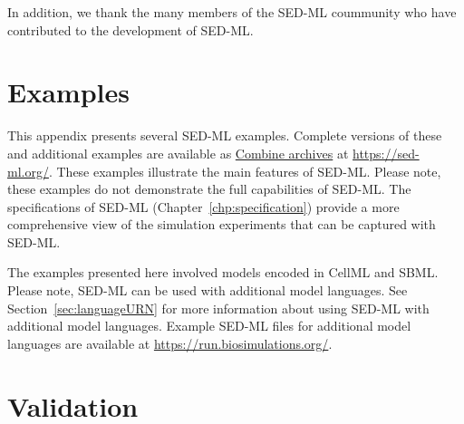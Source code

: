 \documentclass[pdftex,rgb,dvipsnames,svgnames,hyperref,table]{report}
\begin{document}
In addition, we thank the many members of the SED-ML coummunity who have contributed to the development of SED-ML.

\appendix

\chapter{Examples}
\label{app:examples}
This appendix presents several SED-ML examples. Complete versions of these and additional examples are available as \hyperref[sec:archive]{Combine archives} at \url{https://sed-ml.org/}. These examples illustrate the main features of SED-ML. Please note, these examples do not demonstrate the full capabilities of SED-ML. The specifications of SED-ML (Chapter~\ref{chp:specification}) provide a more comprehensive view of the simulation experiments that can be captured with SED-ML. 

The examples presented here involved models encoded in CellML and SBML. Please note, SED-ML can be used with additional model languages. See Section~\ref{sec:languageURN} for more information about using SED-ML with additional model languages. Example SED-ML files for additional model languages are available at \url{https://run.biosimulations.org/}.



\chapter{Validation}
\label{app:validation}
\begin{blockChanged}

\end{blockChanged}

%






\end{document}
